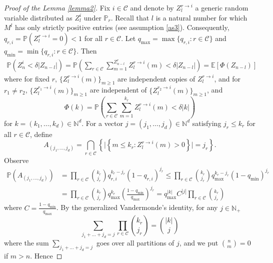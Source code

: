 \documentclass[12pt]{article}
\numberwithin{equation}{section}
\begin{document}
        \begin{proof}[Proof of the Lemma \ref{lemma2}]
        Fix $i \in \mathcal{C}$ and denote by $Z_l^{r \rightarrow i}$ a generic random variable distributed as $Z_l^i$ under $\mathbb{P}_r$. Recall that $l$ is a natural number for which $M^l$ has only strictly positive entries (see  assumption \eqref{as3}). Consequently, $q_{r,i} = \mathbb{P} \left( Z_l^{r \rightarrow i} = 0 \right) < 1$ for all $r \in \mathcal{C}$. Let $q_{\max} = \max \{ q_{r,i}: r \in \mathcal{C}\}$ and $q_{\min} = \min \{ q_{r,i}: r \in \mathcal{C}\}$. Then
        \begin{align*}
            \mathbb{P}\left(Z_n^i < \delta |Z_{n-l}|\right) = \mathbb{P}\left(\sum_{r \in \mathcal{C}} \sum_{m=1}^{Z_{n-l}^r} Z_l^{r \rightarrow i}(m)   < \delta |Z_{n-l}|\right) = \mathbb{E} \left[ \Phi(Z_{n-l})\right]
        \end{align*}
        where for fixed $r$, $\{Z_l^{r \rightarrow i}(m)\}_{m \geq 1} $ are independent copies of $Z_l^{r \rightarrow i}$, and for $r_1\neq r_2$, $\{Z_l^{r_1 \rightarrow i}(m)\}_{m \geq 1} $ are independent of $\{Z_l^{r_2 \rightarrow i}(m)\}_{m \geq 1} $, and 
        \[\Phi(k) = \mathbb{P}\left(\sum_{r \in \mathcal{C}} \sum_{m=1}^{k_r} Z_l^{r \rightarrow i}(m)   < \delta |k|\right)\]
        for $k = (k_1, \dots, k_d) \in \mathbb{N}^d$.
        For a vector $j = (j_1, \dots, j_d) \in \mathbb{N}^d$ satisfying $j_r \leq k_r$ for all $r \in \mathcal{C}$, define \[
        A_{(j_1, \dots, j_d)} =  \bigcap_{r \in \mathcal{C}}\left\{ \Big|\left\{ m \leq k_r: Z_l^{r \rightarrow i}(m) > 0 \right\}\Big| = j_r \right\}.
        \]
        Observe 
        \begin{align*}\mathbb{P}(A_{(j_1, \dots, j_d)}) &= \prod_{r \in \mathcal{C}} \binom{k_r} {j_r} q_{r,i}^{k_r - j_r} \left(1 - q_{r,i}\right)^{j_r} \leq  \prod_{r \in \mathcal{C}} \binom{k_r} {j_r} q_{\max}^{k_r - j_r} \left(1 - q_{\min}\right)^{j_r}  \\&= \prod_{r \in \mathcal{C}} \binom{k_r} {j_r}  q_{\max}^{k_r} \left(\frac {1 - q_{\min}} {q_{\max}}\right)^{j_r} = q_{\max}^{|k|} C^{|j|} \prod_{r \in \mathcal{C}} \binom{k_r} {j_r}\end{align*}
    where $C = \frac {1 - q_{\min}} {q_{\max}}$. By the generalized Vandermonde's identity, for any $j \in \mathbb{N_+}$
    \[
    \sum_{j_1 + \dots + j_d = j} \prod_{r \in \mathcal{C}} \binom{k_r} {j_r} = \binom{|k|} {j}
    \]
    where the sum $\sum_{j_1 + \dots + j_d = j}$ goes over all partitions of $j$, and we put $\binom{n}{m} = 0$ if $m>n$. Hence

\end{proof}
\end{document}
